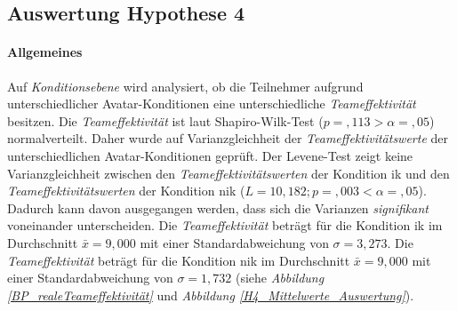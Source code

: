 \documentclass[a4paper,11pt]{article}%
\renewcommand{\\}{\vspace*{0.5\baselineskip} \newline}
\begin{document}
{\newpage
\subsection{Auswertung Hypothese 4}
\label{Auswertung Hypothese 4}

\paragraph{Allgemeines}
Auf \textit{Konditionsebene} wird analysiert, ob die Teilnehmer aufgrund unterschiedlicher Avatar-Konditionen eine unterschiedliche \textit{Teameffektivität} besitzen.\\
Die \textit{Teameffektivität} ist laut Shapiro-Wilk-Test ($p =,113 > \alpha = ,05$) normalverteilt. Daher wurde auf Varianzgleichheit der \textit{Teameffektivitätswerte} der unterschiedlichen Avatar-Konditionen geprüft. Der Levene-Test zeigt keine Varianzgleichheit zwischen den \textit{Teameffektivitätswerten} der Kondition \ac{ik} und den \textit{Teameffektivitätswerten} der Kondition \ac{nik} ($L = 10,182; p=,003 < \alpha = ,05$). Dadurch kann davon ausgegangen werden, dass sich die Varianzen \textit{signifikant} voneinander unterscheiden. \\
Die \textit{Teameffektivität} beträgt für die Kondition \ac{ik} im Durchschnitt $\bar{x} = 9,000$ mit einer Standardabweichung von $\sigma = 3,273$.\newline 
Die \textit{Teameffektivität} beträgt für die Kondition \ac{nik} im Durchschnitt $\bar{x} = 9,000$ mit einer Standardabweichung von $\sigma = 1,732$ (siehe \textit{Abbildung \ref{BP_realeTeameffektivität}} und \textit{Abbildung \ref{H4_Mittelwerte_Auswertung}}).


}
\end{document}
